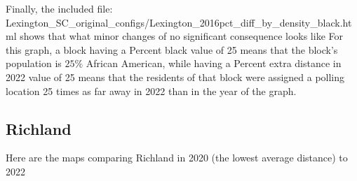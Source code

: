\documentclass[11pt]{article}
\theoremstyle{remark}
\theoremstyle{definition}
\begin{document}
Finally, the included file: \textrm{Lexington\_SC\_original\_configs/Lexington\_2016pct\_diff\_by\_density\_black.html} shows that what minor changes of no significant consequence looks like  For this graph, a block having a Percent black value of 25 means that the block's population is $25\%$ African American, while having a Percent extra distance in 2022 value of 25 means that the residents of that block were assigned a polling location 25 times as far away in 2022 than in the year of the graph.

\pagebreak

\subsection{Richland}
Here are the maps comparing Richland in 2020 (the lowest average distance) to 2022
\end{document}

